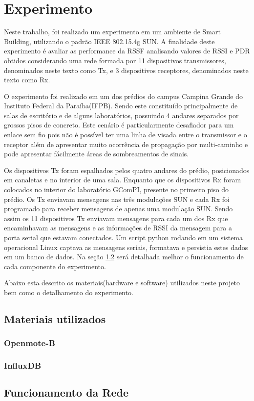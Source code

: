 \chapter{Experimento}
\label{experimento}

Neste trabalho, foi realizado um experimento em um ambiente de Smart Building, utilizando o padrão IEEE 802.15.4g SUN. A finalidade deste experimento é avaliar as performance da RSSF analisando valores de RSSI e PDR obtidos considerando uma rede formada por 11 dispositivos transmissores, denominados neste texto como Tx, e 3 dispositivos receptores, denominados neste texto como Rx.

O experimento foi realizado em um dos prédios do campus Campina Grande do Instituto Federal da Paraíba(IFPB). Sendo este constituído principalmente de salas de escritório e de alguns laboratórios, possuindo 4 andares separados por grossos pisos de concreto. Este cenário é particularmente desafiador para um enlace sem fio pois não é possível ter uma linha de visada entre o transmissor e o receptor além de apresentar muito ocorrência de propagação por multi-caminho e pode apresentar fácilmente áreas de sombreamentos de sinais.

Os dispositivos Tx foram espalhados pelos quatro andares do prédio, posicionados em canaletas e no interior de uma sala. Enquanto que os dispositivos Rx foram colocados no interior do laboratório GComPI, presente no primeiro piso do prédio. Os Tx enviavam mensagens nas três modulações SUN e cada Rx foi programado para receber mensagens de apenas uma modulação SUN. Sendo assim os 11 dispositivos Tx enviavam mensagens para cada um dos Rx que encaminhavam as mensagens e as informações de RSSI da mensagem para a porta serial que estavam conectados. Um script python rodando em um sistema operacional Linux captava as mensagens seriais, formatava e persistia estes dados em um banco de dados. Na seção \ref{funcionamento} será detalhada melhor o funcionamento de cada componente do experimento.

Abaixo esta descrito os materiais(hardware e software) utilizados neste projeto bem como o detalhamento do experimento.

\section{Materiais utilizados}
\subsection*{Openmote-B}
\subsection*{InfluxDB}

\section{Funcionamento da Rede}
\label{funcionamento}
